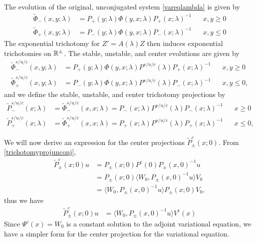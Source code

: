 \documentclass[thesis.tex]{subfiles}
\begin{document}
The evolution of the original, unconjugated system \cref{vareqlambda} is given by
\begin{equation}\label{vareqevol}
\begin{aligned}
\tilde{\Phi}_-(x, y; \lambda) &= P_+(y; \lambda) \Phi(y, x; \lambda) P_+(x; \lambda)^{-1} && x, y \geq 0  \\
\tilde{\Phi}_+(x, y; \lambda) &= P_-(y; \lambda) \Phi(y, x; \lambda) P_-(x; \lambda)^{-1} && x, y \leq 0
\end{aligned}
\end{equation}
The exponential trichotomy for $Z' = A(\lambda)Z$ then induces exponential trichotomies on $\mathbb{R}^\pm$. The stable, unstable, and center evolutions are given by 
\begin{equation*}
\begin{aligned}
\tilde{\Phi}_-^{s/u/c}(x, y; \lambda) &= P_+(y; \lambda) \Phi(y, x; \lambda) P^{s/u/c}(\lambda) P_+(x; \lambda)^{-1} && x, y \geq 0  \\
\tilde{\Phi}_+^{s/u/c}(x, y; \lambda) &= P_-(y; \lambda) \Phi(y, x; \lambda) P^{s/u/c}(\lambda) P_-(x; \lambda)^{-1} && x, y \leq 0,
\end{aligned}
\end{equation*}
and we define the stable, unstable, and center trichotomy projections by
\begin{equation}\label{trichotomyprojunconj}
\begin{aligned}
\tilde{P}_-^{s/u/c}(x; \lambda) &= \tilde{\Phi}_-^{s/u/c}(x, x; \lambda) = P_-(x; \lambda) P^{s/u/c}(\lambda) P_-(x; \lambda)^{-1} && x \geq 0  \\
\tilde{P}_+^{s/u/c}(x; \lambda) &= \tilde{\Phi}_+^{s/u/c}(x, x; \lambda) = P_+(x; \lambda) P^{s/u/c}(\lambda) P_+(x; \lambda)^{-1} && x \leq 0,
\end{aligned}
\end{equation}

We will now derive an expression for the center projections $\tilde{P}^c_\pm(x; 0)$. From \cref{trichotomyprojunconj},
\begin{align*}
\tilde{P}^c_\pm(x; 0) u &= P_\pm(x; 0) P^c(0) P_\pm(x, 0)^{-1} u \\
&= P_\pm(x; 0) \langle W_0, P_\pm(x, 0)^{-1} u \rangle V_0 \\
&= \langle W_0, P_\pm(x, 0)^{-1} u \rangle P_\pm(x; 0) V_0,
\end{align*}
thus we have
\begin{align}\label{centerproj1}
\tilde{P}^c_\pm(x; 0) u 
&= \langle W_0, P_\pm(x, 0)^{-1} u \rangle V^c(x)
\end{align}
Since $\Psi^c(x) = W_0$ is a constant solution to the adjoint variational equation, we have a simpler form for the center projection for the variational equation. 
\end{document}
